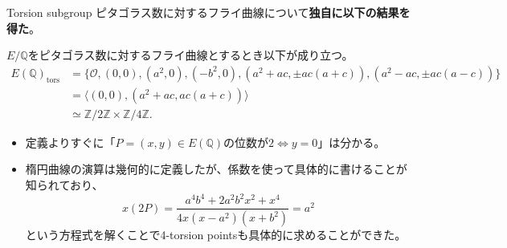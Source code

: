 \documentclass{classes/mybeamer}
\begin{document}
\begin{frame}{Torsion subgroup}
    ピタゴラス数に対するフライ曲線について\textbf{独自に以下の結果を得た}。
    \begin{thm}\label{thm:torsion}
        $E/\mathbb{Q}$をピタゴラス数に対するフライ曲線とするとき以下が成り立つ。
        \begin{equation}
            \begin{split}
                E(\mathbb{Q})_{\mathrm{tors}} &= \{\mathcal{O}, (0,0), (a^2,0), (-b^2,0), (a^2+ac, \pm ac(a+c)), (a^2-ac, \pm ac(a-c))\}\\
                &= \langle(0,0), (a^2+ac, ac(a+c))\rangle\\
                &\simeq \mathbb{Z}/2\mathbb{Z} \times \mathbb{Z}/4\mathbb{Z}.
            \end{split}
        \end{equation}
    \end{thm}
    \begin{alertblock}{}
        \begin{itemize}
            \item 定義よりすぐに「$P=(x,y)\in E(\mathbb{Q})\text{の位数が}2\iff y=0$」は分かる。
            \item 楕円曲線の演算は幾何的に定義したが、係数を使って具体的に書けることが知られており、
                  \begin{equation}
                      x(2P) = \frac{a^4 b^4 + 2 a^2 b^2 x^2 + x^4}{4 x (x-a^2) (x+b^2)} = a^2
                  \end{equation}
                  という方程式を解くことで4-torsion pointsも具体的に求めることができた。
        \end{itemize}
    \end{alertblock}
\end{frame}
\end{document}
